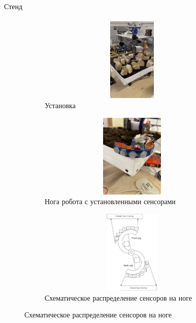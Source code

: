 \documentclass[aspectratio=169,xcolor=table,10pt]{beamer}
\begin{document}
\begin{frame}[t]{Стенд}
    \framesubtitle{}
    \begin{figure}[H]
        \begin{subfigure}{0.33\textwidth}
            \centering\includegraphics[height=4cm,width=1\textwidth,keepaspectratio]{s_shape_leg/rockk.png}
            \caption{Установка}
        \end{subfigure}
        \begin{subfigure}{0.33\textwidth}
            \centering\includegraphics[height=4cm,width=1\textwidth,keepaspectratio]{s_shape_leg/socks.jpg}
            \caption{Нога робота с установленными сенсорами}
        \end{subfigure}
        \begin{subfigure}{0.33\textwidth}
            \centering\includegraphics[height=4cm,width=1\textwidth,keepaspectratio]{s_shape_leg/leg_design.png}
            \caption{Схематическое распределение сенсоров на ноге}
        \end{subfigure}
    \end{figure}
\end{frame}
\end{document}
